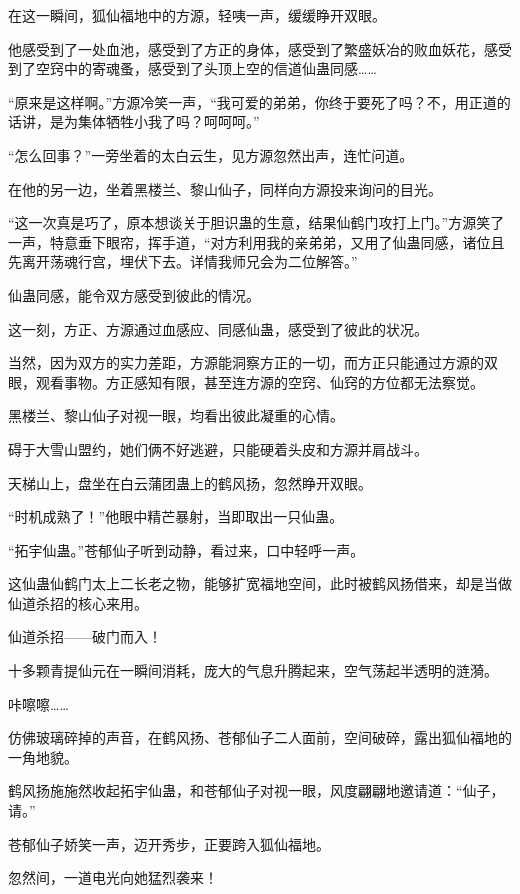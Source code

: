 \begin{this_body}
在这一瞬间，狐仙福地中的方源，轻咦一声，缓缓睁开双眼。

他感受到了一处血池，感受到了方正的身体，感受到了繁盛妖冶的败血妖花，感受到了空窍中的寄魂蚤，感受到了头顶上空的信道仙蛊同感……

“原来是这样啊。”方源冷笑一声，“我可爱的弟弟，你终于要死了吗？不，用正道的话讲，是为集体牺牲小我了吗？呵呵呵。”

“怎么回事？”一旁坐着的太白云生，见方源忽然出声，连忙问道。

在他的另一边，坐着黑楼兰、黎山仙子，同样向方源投来询问的目光。

“这一次真是巧了，原本想谈关于胆识蛊的生意，结果仙鹤门攻打上门。”方源笑了一声，特意垂下眼帘，挥手道，“对方利用我的亲弟弟，又用了仙蛊同感，诸位且先离开荡魂行宫，埋伏下去。详情我师兄会为二位解答。”

仙蛊同感，能令双方感受到彼此的情况。

这一刻，方正、方源通过血感应、同感仙蛊，感受到了彼此的状况。

当然，因为双方的实力差距，方源能洞察方正的一切，而方正只能通过方源的双眼，观看事物。方正感知有限，甚至连方源的空窍、仙窍的方位都无法察觉。

黑楼兰、黎山仙子对视一眼，均看出彼此凝重的心情。

碍于大雪山盟约，她们俩不好逃避，只能硬着头皮和方源并肩战斗。

天梯山上，盘坐在白云蒲团蛊上的鹤风扬，忽然睁开双眼。

“时机成熟了！”他眼中精芒暴射，当即取出一只仙蛊。

“拓宇仙蛊。”苍郁仙子听到动静，看过来，口中轻呼一声。

这仙蛊仙鹤门太上二长老之物，能够扩宽福地空间，此时被鹤风扬借来，却是当做仙道杀招的核心来用。

仙道杀招——破门而入！

十多颗青提仙元在一瞬间消耗，庞大的气息升腾起来，空气荡起半透明的涟漪。

咔嚓嚓……

仿佛玻璃碎掉的声音，在鹤风扬、苍郁仙子二人面前，空间破碎，露出狐仙福地的一角地貌。

鹤风扬施施然收起拓宇仙蛊，和苍郁仙子对视一眼，风度翩翩地邀请道：“仙子，请。”

苍郁仙子娇笑一声，迈开秀步，正要跨入狐仙福地。

忽然间，一道电光向她猛烈袭来！

\end{this_body}

